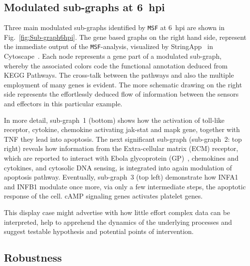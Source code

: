 \documentclass[10pt,a4paper,twocolumn]{article}
\begin{document}
\subsection*{Modulated sub-graphs at 6~hpi}

Three main modulated sub-graphs identified by \texttt{MSF} at 6~hpi are
shown in Fig.~\ref{fig:Sub-graph6hpi}. The gene based graphs on the right
hand side, represent the immediate output of the \texttt{MSF}-analysis,
visualized by StringApp~\cite{StringApp} in Cytoscape~\cite{Cyto}. Each
node represents a gene part of a modulated sub-graph, whereby the
associated colors code the functional annotation deduced from KEGG
Pathways. The cross-talk between the pathways and also the multiple
employment of many genes is evident. The more schematic drawing on the
right side represents the effortlessly deduced flow of information between
the sensors and effectors in this particular example.

In more detail, sub-graph~1 (bottom) shows how the activation of toll-like
receptor, cytokine, chemokine activating jak-stat and mapk gene, together with TNF they lead into apoptosis. The next significant sub-graph (sub-graph~2: top right) reveals
how information from the Extra-cellular matrix (ECM) receptor, which are
reported to interact with Ebola glycoprotein (GP)~\cite{Veljkovic},
chemokines and cytokines, and cytosolic DNA sensing, is integrated into
again modulation of apoptosis pathway. Eventually, sub-graph~3 (top left)
demonstrate how INFA1 and INFB1 modulate once more, via only a few
intermediate steps, the apoptotic response of the cell. cAMP signaling genes activates platelet genes.

This display case might advertise with how little effort complex data
can be interpreted, help to apprehend the dynamics of the underlying
processes and suggest testable hypothesis and potential points of
intervention.

\subsection*{Robustness}
\end{document}
